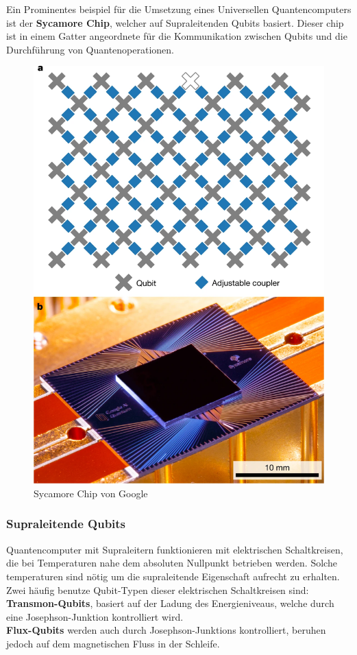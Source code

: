 Ein Prominentes beispiel für die Umsetzung eines Universellen Quantencomputers ist der \textbf{Sycamore Chip}, welcher auf Supraleitenden Qubits basiert.
Dieser chip ist in einem Gatter angeordnete für die Kommunikation zwischen Qubits und die Durchführung von Quantenoperationen.\\

\begin{figure}[H]
    \centering
    \includegraphics[width=0.7\linewidth]{img/SycamoreChip.png}
    \caption{Sycamore Chip von Google}
    \label{fig:Sycamore}
\end{figure}

\subsubsection{Supraleitende Qubits}
\label{subsub:superleiter}
Quantencomputer mit Supraleitern funktionieren mit elektrischen Schaltkreisen, die bei Temperaturen nahe dem absoluten Nullpunkt betrieben werden. Solche temperaturen sind nötig
um die supraleitende Eigenschaft aufrecht zu erhalten.\\

Zwei häufig benutze Qubit-Typen dieser elektrischen Schaltkreisen sind:\\
\textbf{Transmon-Qubits}, basiert auf der Ladung des Energieniveaus, welche durch eine Josephson-Junktion kontrolliert wird.\\
\textbf{Flux-Qubits} werden auch durch Josephson-Junktions kontrolliert, beruhen jedoch auf dem magnetischen Fluss in der Schleife.\\

